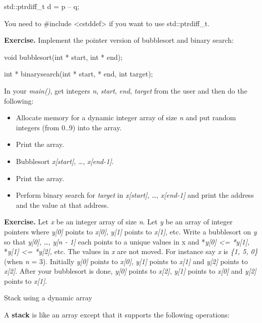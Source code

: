 \documentclass[
]{article}
\providecommand{\tightlist}{%
  \setlength{\itemsep}{0pt}\setlength{\parskip}{0pt}}
\begin{document}
std::ptrdiff\_t d = p -- q;

You need to \#include \textless cstddef\textgreater{} if you want to use
std::ptrdiff\_t.

\textbf{Exercise.} Implement the pointer version of bubblesort and
binary search:

void bubblesort(int * start, int * end);

int * binarysearch(int * start, * end, int target);

In your \emph{main()}, get integers \emph{n}, \emph{start}, \emph{end},
\emph{target} from the user and then do the following:

\begin{itemize}
\tightlist
\item
  Allocate memory for a dynamic integer array of size \emph{n} and put
  random integers (from 0..9) into the array.
\item
  Print the array.
\item
  Bubblesort \emph{x{[}start{]}}, \ldots, \emph{x{[}end-1{]}}.
\item
  Print the array.
\item
  Perform binary search for \emph{target} in \emph{x{[}start{]}},
  \ldots, \emph{x{[}end-1{]} }and print the address and the value at
  that address.
\end{itemize}

\textbf{Exercise.} Let \emph{x} be an integer array of size \emph{n}.
Let \emph{y} be an array of integer pointers where \emph{y{[}0{]}}
points to \emph{x{[}0{]}}, \emph{y{[}1{]}} points to \emph{x{[}1{]}},
etc. Write a bubblesort on \emph{y} so that \emph{y{[}0{]}}, \ldots,
\emph{y{[}n - 1{]}} each points to a unique values in x and
*\emph{y{[}0{]} \textless= *y{[}1{]}, }*\emph{y{[}1{]} \textless=
*y{[}2{]},} etc. The values in \emph{x} are not moved. For instance say
\emph{x} is \emph{\{1, 5, 0\}} (when \emph{n} = 3). Initially
\emph{y{[}0{]}} points to \emph{x{[}0{]}}, \emph{y{[}1{]}} points to
\emph{x{[}1{]}} and \emph{y{[}2{]}} points to \emph{x{[}2{]}}. After
your bubblesort is done, \emph{y{[}0{]}} points to \emph{x{[}2{]}},
\emph{y{[}1{]}} points to \emph{x{[}0{]}} and \emph{y{[}2{]}} points to
\emph{x{[}1{]}}.

Stack using a dynamic array

A \textbf{stack} is like an array except that it supports the following
operations:
\end{document}
